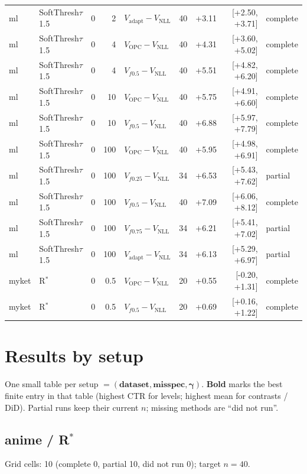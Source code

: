 \documentclass[10pt,a4paper]{article}
\begin{document}
{\begin{longtable}{llrrlrrrl}
ml & SoftThresh$\tau$1.5 & 0 & 2 & $V_{\mathrm{adapt}}-V_{\mathrm{NLL}}$ & 40 & +3.11 & [+2.50, +3.71] & complete \\
ml & SoftThresh$\tau$1.5 & 0 & 4 & $V_{\mathrm{OPC}}-V_{\mathrm{NLL}}$ & 40 & +4.31 & [+3.60, +5.02] & complete \\
ml & SoftThresh$\tau$1.5 & 0 & 4 & $V_{f0.5}-V_{\mathrm{NLL}}$ & 40 & +5.51 & [+4.82, +6.20] & complete \\
ml & SoftThresh$\tau$1.5 & 0 & 10 & $V_{\mathrm{OPC}}-V_{\mathrm{NLL}}$ & 40 & +5.75 & [+4.91, +6.60] & complete \\
ml & SoftThresh$\tau$1.5 & 0 & 10 & $V_{f0.5}-V_{\mathrm{NLL}}$ & 40 & +6.88 & [+5.97, +7.79] & complete \\
ml & SoftThresh$\tau$1.5 & 0 & 100 & $V_{\mathrm{OPC}}-V_{\mathrm{NLL}}$ & 40 & +5.95 & [+4.98, +6.91] & complete \\
ml & SoftThresh$\tau$1.5 & 0 & 100 & $V_{f0.25}-V_{\mathrm{NLL}}$ & 34 & +6.53 & [+5.43, +7.62] & partial \\
ml & SoftThresh$\tau$1.5 & 0 & 100 & $V_{f0.5}-V_{\mathrm{NLL}}$ & 40 & +7.09 & [+6.06, +8.12] & complete \\
ml & SoftThresh$\tau$1.5 & 0 & 100 & $V_{f0.75}-V_{\mathrm{NLL}}$ & 34 & +6.21 & [+5.41, +7.02] & partial \\
ml & SoftThresh$\tau$1.5 & 0 & 100 & $V_{\mathrm{adapt}}-V_{\mathrm{NLL}}$ & 34 & +6.13 & [+5.29, +6.97] & partial \\
myket & R$^*$ & 0 & 0.5 & $V_{\mathrm{OPC}}-V_{\mathrm{NLL}}$ & 20 & +0.55 & [-0.20, +1.31] & complete \\
myket & R$^*$ & 0 & 0.5 & $V_{f0.5}-V_{\mathrm{NLL}}$ & 20 & +0.69 & [+0.16, +1.22] & complete \\
\end{longtable}}
\newpage
\section{Results by setup}
One small table per setup $=(\textbf{dataset},\textbf{misspec},\boldsymbol{\gamma})$. \textbf{Bold} marks the best finite entry in that table (highest CTR for levels; highest mean for contrasts / DiD). Partial runs keep their current $n$; missing methods are ``did not run''.

\subsection{anime / R$^*$}
Grid cells: 10 (complete 0, partial 10, did not run 0); target $n=40$.
\end{document}
